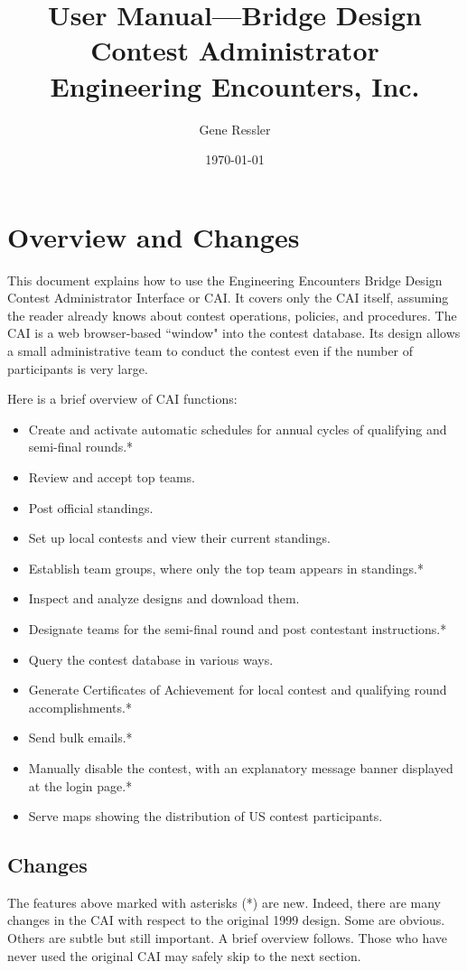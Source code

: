 \documentclass[11pt,letterpaper]{refart}
\title{User Manual---Bridge Design Contest Administrator \\[1ex]
\small Engineering Encounters, Inc.}
\author{Gene Ressler}
\date{\today}
\begin{document}
\maketitle
\tableofcontents\newpage

\section{Overview and Changes}
This document explains how to use the Engineering Encounters Bridge
Design Contest Administrator Interface or CAI. It covers only the CAI
itself, assuming the reader already knows about contest operations,
policies, and procedures. The CAI is a web browser-based ``window"
into the contest database. Its design allows a small administrative
team to conduct the contest even if the number of participants is very
large.

Here is a brief overview of CAI functions:
\begin{itemize}
\item Create and activate automatic schedules for annual cycles of qualifying and semi-final rounds.*
\item Review and accept top teams.
\item Post official standings.
\item Set up local contests and view their current standings.
\item Establish team groups, where only the top team appears in standings.*
\item Inspect and analyze designs and download them.
\item Designate teams for the semi-final round and post contestant instructions.*
\item Query the contest database in various ways.
\item Generate Certificates of Achievement for local contest and qualifying round accomplishments.*
\item Send bulk emails.*
\item Manually disable the contest, with an explanatory message banner displayed at
 the login page.*
\item Serve maps showing the distribution of US contest participants.
\end{itemize}

\subsection{Changes}
The features above marked with asterisks (*) are new. Indeed, there
are many changes in the CAI with respect to the original 1999
design. Some are obvious. Others are subtle but still important. A
brief overview follows. Those who have never used the original CAI may
safely skip to the next section.
\end{document}
